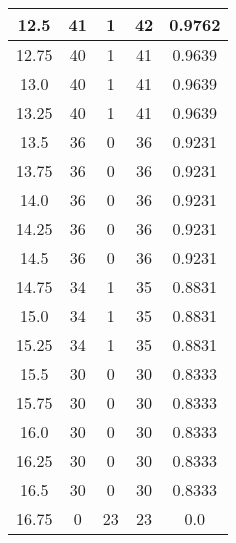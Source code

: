 \documentclass[letterpaper, 12pt]{article}
\begin{document}
\begin{longtable}{|c|c|c|c|c|}
12.5 & 41 & 1 & 42 & 0.9762 \\
\hline
12.75 & 40 & 1 & 41 & 0.9639 \\
\hline
13.0 & 40 & 1 & 41 & 0.9639 \\
\hline
13.25 & 40 & 1 & 41 & 0.9639 \\
\hline
13.5 & 36 & 0 & 36 & 0.9231 \\
\hline
13.75 & 36 & 0 & 36 & 0.9231 \\
\hline
14.0 & 36 & 0 & 36 & 0.9231 \\
\hline
14.25 & 36 & 0 & 36 & 0.9231 \\
\hline
14.5 & 36 & 0 & 36 & 0.9231 \\
\hline
14.75 & 34 & 1 & 35 & 0.8831 \\
\hline
15.0 & 34 & 1 & 35 & 0.8831 \\
\hline
15.25 & 34 & 1 & 35 & 0.8831 \\
\hline
15.5 & 30 & 0 & 30 & 0.8333 \\
\hline
15.75 & 30 & 0 & 30 & 0.8333 \\
\hline
16.0 & 30 & 0 & 30 & 0.8333 \\
\hline
16.25 & 30 & 0 & 30 & 0.8333 \\
\hline
16.5 & 30 & 0 & 30 & 0.8333 \\
\hline
16.75 & 0 & 23 & 23 & 0.0 \\
\hline
\end{longtable}
\end{document}

